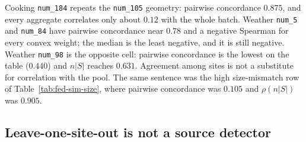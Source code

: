 Cooking \texttt{num\_184} repeats the \texttt{num\_105} geometry: pairwise
concordance $0.875$, and every aggregate correlates only about $0.12$ with
the whole batch.
Weather \texttt{num\_5} and \texttt{num\_84} have pairwise concordance near
$0.78$ and a negative Spearman for every convex weight; the median is the
least negative, and it is still negative.
Weather \texttt{num\_98} is the opposite cell: pairwise concordance is the
lowest on the table ($0.440$) and $n|S|$ reaches $0.631$.
Agreement among sites is not a substitute for correlation with the pool.
The same sentence was the high size-mismatch row of
Table~\ref{tab:fed-sim-size}, where pairwise concordance was $0.105$ and
$\rho(n|S|)$ was $0.905$.

\subsection{Leave-one-site-out is not a source detector}
\label{sec:loso}

